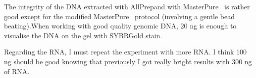 The integrity of the DNA extracted with AllPrep\cR and with MasterPure\texttrademark~ is rather good except for the modified MasterPure\texttrademark~ protocol (involving a gentle bead beating).When working with good quality genomic DNA, 20 ng is enough to visualise the DNA on the gel with SYBR\cR Gold stain. 

Regarding the RNA, I must repeat the experiment with more RNA. I think 100 ng should be good knowing that previously I got really bright results with 300 ng of RNA.

